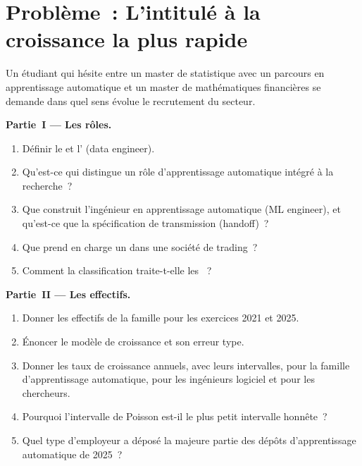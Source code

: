 \section{Problème~: L'intitulé à la croissance la plus rapide}

\begin{problem}\label{pb:in:machine-learning-and-data-engineer:1}
Un étudiant qui hésite entre un master de statistique avec un parcours en apprentissage automatique et un master de mathématiques
financières se demande dans quel sens évolue le recrutement du secteur.

\medskip\noindent\textbf{Partie~I --- Les rôles.}
\begin{enumerate}
\item Définir le  et l' (data engineer).
\item Qu'est-ce qui distingue un rôle d'apprentissage automatique intégré à la recherche~?
\item Que construit l'ingénieur en apprentissage automatique (ML engineer), et qu'est-ce que la spécification de transmission (handoff)~?
\item Que prend en charge un  dans une société de trading~?
\item Comment la classification traite-t-elle les ~?
\end{enumerate}

\medskip\noindent\textbf{Partie~II --- Les effectifs.}
\begin{enumerate}[resume]
\item Donner les effectifs de la famille pour les exercices 2021 et 2025.
\item Énoncer le modèle de croissance et son erreur type.
\item Donner les taux de croissance annuels, avec leurs intervalles, pour la famille d'apprentissage automatique, pour les ingénieurs logiciel et pour les chercheurs.
\item Pourquoi l'intervalle de Poisson est-il le plus petit intervalle honnête~?
\item Quel type d'employeur a déposé la majeure partie des dépôts d'apprentissage automatique de 2025~?
\end{enumerate}


\end{problem}
